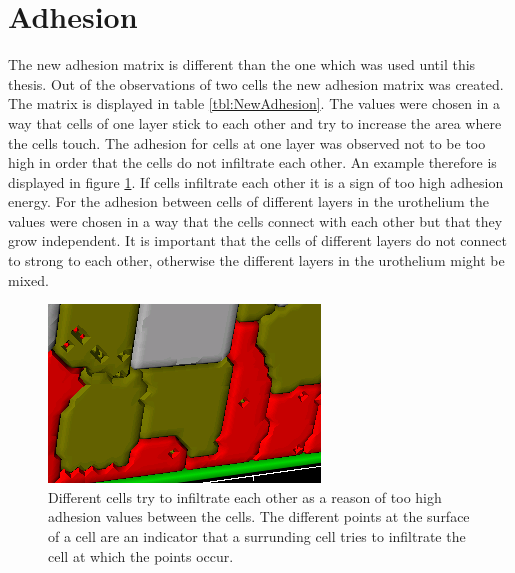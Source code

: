 \section{Adhesion}
The new adhesion matrix is different than the one which was used until this thesis. Out of the observations of two cells the new adhesion matrix was created. The matrix is displayed in table \ref{tbl:NewAdhesion}. The values were chosen in a way that cells of one layer stick to each other and try to increase the area where the cells touch. The adhesion for cells at one layer was observed not to be too high in order that the cells do not infiltrate each other. An example therefore is displayed in figure \ref{img:InfiltratingCells}. If cells infiltrate each other it is a sign of too high adhesion energy. For the adhesion between cells of different layers in the urothelium the values were chosen in a way that the cells connect with each other but that they grow independent. It is important that the cells of different layers do not connect to strong to each other, otherwise the different layers in the urothelium might be mixed. 
\begin{figure}[ht]
	\center
	\includegraphics[scale=1.2]{figures/TooHighAdhesion1.png}
	\caption[Different cells try to infiltrate each other]{Different cells try to infiltrate each other as a reason of too high adhesion values between the cells. The different points at the surface of a cell are an indicator that a surrunding cell tries to infiltrate the cell at which the points occur.}
	\label{img:InfiltratingCells}
\end{figure}



